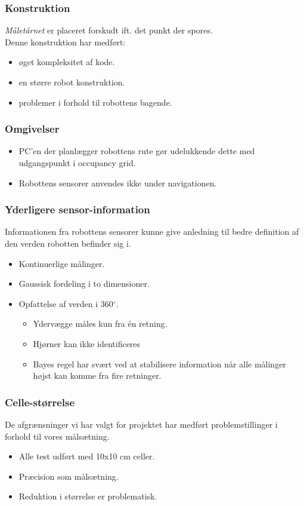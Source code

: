 \begin{frame}
\frametitle{Konstruktion}
\textit{Måletårnet} er placeret forskudt ift. det punkt der spores.\\
Denne konstruktion har medført:
\begin{itemize}
\item øget kompleksitet af kode.
\item en større robot konstruktion.
\item problemer i forhold til robottens bagende.
\end{itemize}
\end{frame}

\begin{frame}
\frametitle{Omgivelser}
\begin{itemize}
\item PC'en der planlægger robottens rute gør udelukkende dette med udgangspunkt i occupancy grid.
\item Robottens sensorer anvendes ikke under navigationen.
\end{itemize}
\centering
{}
\end{frame}

\begin{frame}
\frametitle{Yderligere sensor-information}
Informationen fra robottens sensorer kunne give anledning til bedre definition af den verden robotten befinder sig i.
\begin{itemize}
\item Kontinuerlige målinger.
\item Gaussisk fordeling i to dimensioner.
\item Opfattelse af verden i 360$^\circ$.
\begin{itemize}
\item Ydervægge måles kun fra \'en retning.
\item Hjørner kan ikke identificeres
\item Bayes regel har svært ved at stabilisere information når alle målinger højst kan komme fra fire retninger.
\end{itemize}
\end{itemize}
\end{frame}

\begin{frame}
\frametitle{Celle-størrelse}
De afgrænsninger vi har valgt for projektet har medført problemstillinger i forhold til vores målsætning.
\begin{itemize}
\item Alle test udført med 10x10 cm celler.
\item Præcision som målsætning.
\item Reduktion i størrelse er problematisk.
\end{itemize}
\end{frame}

